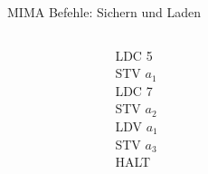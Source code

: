 \documentclass[handout]{beamer}
\begin{document}
\begin{frame}{MIMA Befehle: Sichern und Laden}
	\bp 
	\vspace{.5cm}
	\vspace{.4cm}
	
	\begin{columns}
        \begin{column}{0.06\textwidth}
        \end{column}

		\begin{column}{0.15\textwidth}
			LDC 5 \\ STV $a_1$ \\ LDC 7 \\ STV $a_2$ \\ LDV $a_1$ \\ STV $a_3$ \\ HALT
		\end{column}

        \vline
        \begin{column}{0.06\textwidth}
        \end{column}
		
		\begin{column}{0.24\textwidth}
			\begin{memory}
			\end{memory}
		\end{column}
	\end{columns}
\end{frame}
\end{document}
